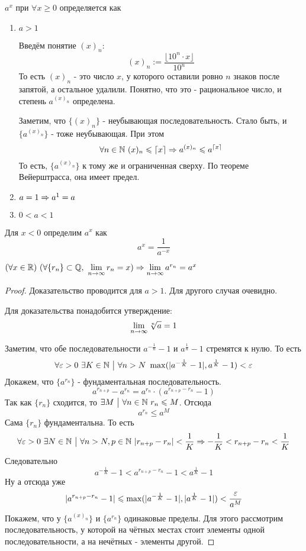 \begin{definition}
	$a^x$ при $\forall x \ge 0$ определяется как
	\begin{enumerate}
		\item $a > 1$
		
		Введём понятие $(x)_n$:
		\[
			(x)_n := \frac{\lfloor10^n \cdot x\rfloor}{10^n}
		\]
		То есть $(x)_n$ - это число $x$, у которого оставили ровно $n$ знаков после запятой, а остальное удалили. Понятно, что это - рациональное число, и степень $a^{(x)_n}$ определена.
		
		Заметим, что $\{(x)_n\}$ - неубывающая последовательность. Стало быть, и $\{a^{(x)_n}\}$ - тоже неубывающая. При этом
		\[
			\forall n \in \mathbb{N}\ (x)_n \leqslant \lceil x \rceil \Rightarrow a^{(x)_n} \leqslant a^{\lceil x \rceil}
		\]
		То есть, $\{a^{(x)_n}\}$ к тому же и ограниченная сверху. По теореме Вейерштрасса, она имеет предел.
		\
		\item $a = 1 \Rightarrow a^1 = a$
		\item $0 < a < 1$
	\end{enumerate}

	Для $x < 0$ определим $a^x$ как
	\[
		a^x = \frac{1}{a^{-x}}
	\]
\end{definition}

\begin{lemma}
	$(\forall x \in \mathbb{R})\ (\forall \{r_n\} \subset \mathbb{Q},\ \lim\limits_{n \to \infty} r_n = x) \Rightarrow \lim\limits_{n \to \infty} a^{r_n} = a^x$
\end{lemma}

\begin{proof}
	Доказательство проводится для $a > 1$. Для другого случая очевидно.
	
	Для доказательства понадобится утверждение:
	$$
		\lim\limits_{n \to \infty} \sqrt[n]{a} = 1
	$$
	
	Заметим, что обе последовательности $a^{-\frac{1}{n}} - 1$ и $a^{\frac{1}{n}} - 1$ стремятся к нулю. То есть
	$$
		\forall \varepsilon > 0\ \exists K \in \mathbb{N} \ \big|\  \forall n > N\ \max(|a^{-\frac{1}{K}} - 1|, a^{\frac{1}{K}} - 1) < \varepsilon
	$$
	Докажем, что $\{a^{r_n}\}$ - фундаментальная последовательность.
	$$
		a^{r_{n + p}} - a^{r_n} = a^{r_n} \cdot (a^{r_{n + p} - r_n} - 1)
	$$
	Так как $\{r_n\}$ сходится, то $\exists M \ \big|\  \forall n \in \mathbb{N}\ r_n \leqslant M$. Отсюда
	$$
		a^{r_n} \le a^M
	$$
	Сама $\{r_n\}$ фундаментальна. То есть
	$$
		\forall \varepsilon > 0\ \exists N \in \mathbb{N} \ \big|\  \forall n > N, p \in \mathbb{N}\ |r_{n + p} - r_n| < \frac{1}{K} \Rightarrow -\frac{1}{K} < r_{n + p} - r_n < \frac{1}{K}
	$$
	Следовательно
	$$
		a^{-\frac{1}{K}} - 1 < a^{r_{n + p} - r_n} - 1 < a^{\frac{1}{K}} - 1
	$$
	Ну а отсюда уже
	$$
		|a^{r_{n + p} - r_n} - 1| \leqslant \max(|a^{-\frac{1}{K}} - 1|, |a^{\frac{1}{K}} - 1|) < \frac{\varepsilon}{a^M}
	$$
	Покажем, что у $\{a^{(x)_n}\}$ и $\{a^{r_n}\}$ одинаковые пределы. Для этого рассмотрим последовательность, у которой на чётных местах стоит элементы одной последовательности, а на нечётных - элементы другой.
\end{proof}

